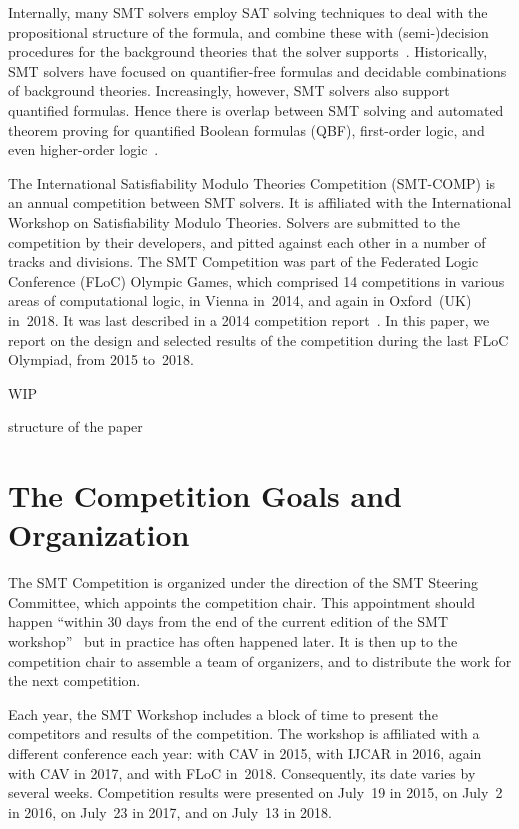 \documentclass[twoside,11pt]{article}
\begin{document}
Internally, many SMT solvers employ SAT solving techniques to deal
with the propositional structure of the formula, and combine these
with (semi-)decision procedures for the background theories that the
solver supports~\cite{TODO,TODO,TODO}.  Historically, SMT solvers have
focused on quantifier-free formulas and decidable combinations of
background theories.  Increasingly, however, SMT solvers also support
quantified formulas.  Hence there is overlap between SMT solving and
automated theorem proving for quantified Boolean formulas (QBF),
first-order logic, and even higher-order logic~\cite{TODO}.

The International Satisfiability Modulo Theories Competition
(SMT-COMP) is an annual competition between SMT solvers.  It is
affiliated with the International Workshop on Satisfiability Modulo
Theories.  Solvers are submitted to the competition by their
developers, and pitted against each other in a number of tracks and
divisions.  The SMT Competition was part of the Federated Logic
Conference (FLoC) Olympic Games, which comprised 14 competitions in
various areas of computational logic, in Vienna in~2014, and again in
Oxford~(UK) in~2018.  It was last described in a 2014 competition
report~\cite{DBLP:journals/jsat/CokDW14}.  In this paper, we report on
the design and selected results of the competition during the last
FLoC Olympiad, from 2015 to~2018.

\begin{tjark}
  WIP

  structure of the paper
\end{tjark}


\section{The Competition Goals and Organization}
\label{sec:goals}

The SMT Competition is organized under the direction of the SMT
Steering Committee, which appoints the competition chair.  This
appointment should happen ``within 30 days from the end of the current
edition of the SMT workshop''~\cite{smt-bylaws} but in practice has
often happened later.  It is then up to the competition chair to
assemble a team of organizers, and to distribute the work for the next
competition.

Each year, the SMT Workshop includes a block of time to present the
competitors and results of the competition.  The workshop is
affiliated with a different conference each year: with CAV in 2015,
with IJCAR in 2016, again with CAV in 2017, and with FLoC in~2018.
Consequently, its date varies by several weeks.  Competition results
were presented on July~19 in 2015, on July~2 in 2016, on July~23 in
2017, and on July~13 in 2018.
\end{document}

